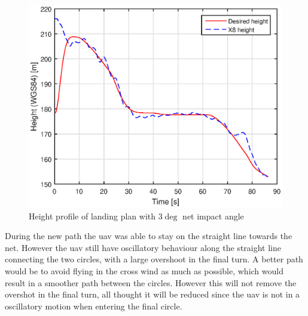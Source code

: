 \begin{figure}[H]
\centering
		\includegraphics[scale=0.7]{figs/Experiment/Height31mai103029.eps}
		\caption{Height profile of landing plan with $3 \deg$ net impact angle}
		\label{Fig:Height31mai103029}
\end{figure}
During the new path the \gls{uav} was able to stay on the straight line towards the net. However the \gls{uav} still have oscillatory behaviour along the straight line connecting the two circles, with a large overshoot in the final turn. A better path would be to avoid flying in the cross wind as much as possible, which would result in a smoother path between the circles. However this will not remove the overshot in the final turn, all thought it will be reduced since the \gls{uav} is not in a oscillatory motion when entering the final circle. 

